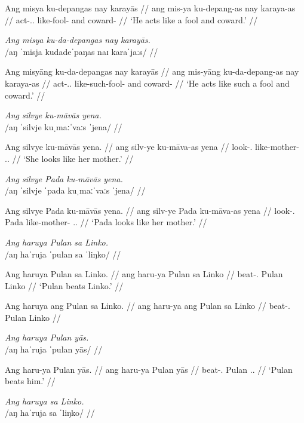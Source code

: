 \documentclass[12pt,a4paper]{scrartcl}
\newcommand{\TsgM}{{\Tsg}.{\M}}
\newcommand{\TsgF}{{\Tsg}.{\F}}
\begin{document}
\gla Ang misya ku-depangas nay karayās //
\glb ang mis-ya ku-depang-as nay karaya-as //
\glc \AgtT{} act-\TsgM{}.\Aarg{} like-fool-\Parg{} and coward-\Parg{} //
\glft `He acts like a fool and coward.' //
\endgl\xe

\ex\begingl
\glpreamble \textit{Ang misya ku-da-depangas nay karayās.}\\
	/aŋ ˈmisja kudadeˈpaŋas naɪ karaˈjaːs/ //

\gla Ang  misyāng ku-da-depangas nay karayās //
\glb ang mis-yāng ku-da-depang-as nay karaya-as //
\glc \AgtT{} act-\TsgM{}.\Aarg{} like-such-fool-\Parg{} and coward-\Parg{} //
\glft `He acts like such a fool and coward.' //
\endgl\xe

\ex\begingl
\glpreamble \textit{Ang silvye ku-māvās yena.}\\
	/aŋ ˈsilvje kuˌmaːˈvaːs ˈjena/ //

\gla Ang silvye ku-māvās yena. //
\glb ang silv-ye ku-māva-as yena //
\glc \AgtT{} look-\TsgF{} like-mother-\Parg{} \TsgF{}.\Gen{} //
\glft `She looks like her mother.' //
\endgl\xe

\ex\begingl
\glpreamble \textit{Ang silvye Pada ku-māvās yena.}\\
	/aŋ ˈsilvje ˈpada kuˌmaːˈvaːs ˈjena/ //

\gla Ang silvye Pada ku-māvās yena. //
\glb ang silv-ye Pada ku-māva-as yena //
\glc \AgtT{} look-\TsgF{} Pada like-mother-\Parg{} \TsgF{}.\Gen{} //
\glft `Pada looks like her mother.' //
\endgl\xe

\pex
\a\begingl
\glpreamble \textit{Ang haruya Pulan sa Linko.} \\
	/aŋ haˈruja ˈpulan sa ˈliŋko/ //

\gla Ang haruya Pulan sa Linko. //
\glb ang haru-ya Pulan sa Linko //
\glc \AgtT{} beat-\TsgM{} Pulan \Parg{} Linko //
\glft `Pulan beats Linko.' //
\endgl

\a\ljudge*\begingl
\gla Ang haruya ang Pulan sa Linko. //
\glb ang haru-ya ang Pulan sa Linko //
\glc \AgtT{} beat-\TsgM{} \Aarg{} Pulan \Parg{} Linko //
\endgl
\xe

\ex\begingl
\glpreamble \textit{Ang haruya Pulan yās.}\\
	/aŋ haˈruja ˈpulan yās/ //

\gla Ang haru-ya Pulan yās. //
\glb ang haru-ya Pulan yās //
\glc \AgtT{} beat-\TsgM{} Pulan \TsgM{}.\Parg{} //
\glft `Pulan beats him.' //
\endgl\xe

\pex
\a\begingl
\glpreamble \textit{Ang haruya sa Linko.} \\
	/aŋ haˈruja sa ˈliŋko/ //
\end{document}
